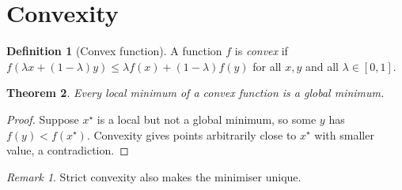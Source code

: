 \documentclass{article}
\theoremstyle{plain}
\newtheorem{theorem}{Theorem}[section]
\theoremstyle{definition}
\newtheorem{definition}[theorem]{Definition}
\theoremstyle{remark}
\newtheorem*{remark}{Remark}
\begin{document}
\section{Convexity}
\begin{definition}[Convex function]
  A function $f$ is \emph{convex} if
  $f(\lambda x + (1-\lambda) y) \le \lambda f(x) + (1-\lambda) f(y)$
  for all $x, y$ and all $\lambda \in [0, 1]$.
\end{definition}

\begin{theorem}\label{thm:global}
  Every local minimum of a convex function is a global minimum.
\end{theorem}

\begin{proof}
  Suppose $x^\star$ is a local but not a global minimum, so some $y$ has
  $f(y) < f(x^\star)$. Convexity gives points arbitrarily close to $x^\star$
  with smaller value, a contradiction.
\end{proof}

\begin{remark}
  Strict convexity also makes the minimiser unique.
\end{remark}
\end{document}
